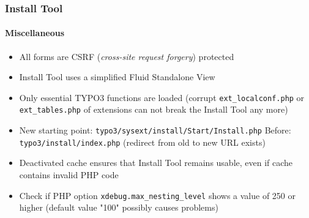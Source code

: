 \begin{frame}[fragile]
	\frametitle{Install Tool}
	\framesubtitle{Miscellaneous}

	\begin{itemize}
		\item All forms are CSRF (\textit{cross-site request forgery}) protected
		\item Install Tool uses a simplified Fluid Standalone View
		\item Only essential TYPO3 functions are loaded\newline
			(corrupt \texttt{ext\_localconf.php} or \texttt{ext\_tables.php} of extensions can not break the Install Tool any more)
		\item New starting point:	\tabto{3.2cm} \texttt{typo3/sysext/install/Start/Install.php}\newline
			Before:			\tabto{3.2cm} \texttt{typo3/install/index.php}\newline
			(redirect from old to new URL exists)
		\item Deactivated cache ensures that Install Tool remains usable, even if cache contains invalid PHP code
		\item Check if PHP option \texttt{xdebug.max\_nesting\_level} shows a value of 250 or higher (default value "100" possibly causes problems)
	\end{itemize}

\end{frame}


